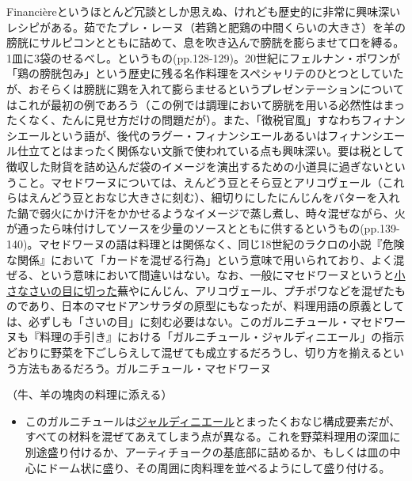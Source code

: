 \begin{recette}
{{{{{  Financière}というほとんど冗談としか思えぬ、けれども歴史的に非常に興味深いレシピがある。茹でたプレ・レーヌ（若鶏と肥鶏の中間くらいの大きさ）を羊の膀胱にサルピコンとともに詰めて、息を吹き込んで膀胱を膨らませて口を縛る。1皿に3袋のせるべし。というもの(pp.128-129)。20世紀にフェルナン・ポワンが「鶏の膀胱包み」という歴史に残る名作料理をスペシャリテのひとつとしていたが、おそらくは膀胱に鶏を入れて膨らませるというプレゼンテーションについてはこれが最初の例であろう（この例では調理において膀胱を用いる必然性はまったくなく、たんに見せ方だけの問題だが）。また、「徴税官風」すなわちフィナンシエールという語が、後代のラグー・フィナンシエールあるいはフィナンシエール仕立てとはまったく関係ない文脈で使われている点も興味深い。要は税として徴収した財貨を詰め込んだ袋のイメージを演出するための小道具に過ぎないということ。マセドワーヌについては、えんどう豆とそら豆とアリコヴェール（これらはえんどう豆とおなじ大きさに刻む）、細切りにしたにんじんをバターを入れた鍋で弱火にかけ汗をかかせるようなイメージで蒸し煮し、時々混ぜながら、火が通ったら味付けしてソースを少量のソースとともに供するというもの(pp.139-140)。マセドワーヌの語は料理とは関係なく、同じ18世紀のラクロの小説『危険な関係』において「カードを混ぜる行為」という意味で用いられており、よく混ぜる、という意味において間違いはない。なお、一般にマセドワーヌというと\ul{小さなさいの目に切った}蕪やにんじん、アリコヴェール、プチポワなどを混ぜたものであり、日本のマセドアンサラダの原型にもなったが、料理用語の原義としては、必ずしも「さいの目」に刻む必要はない。このガルニチュール・マセドワーヌも『料理の手引き』における「ガルニチュール・ジャルディニエール」の指示どおりに野菜を下ごしらえして混ぜても成立するだろうし、切り方を揃えるという方法もあるだろう。}}{ガルニチュール・マセドワーヌ}}\label{garniture-macedoine}}



（牛、羊の塊肉の料理に添える）

\begin{itemize}
\tightlist
\item
  このガルニチュールは\protect\hyperlink{garniture-jardiniere}{ジャルディニエール}とまったくおなじ構成要素だが、すべての材料を混ぜてあえてしまう点が異なる。これを野菜料理用の深皿に別途盛り付けるか、アーティチョークの基底部に詰めるか、もしくは皿の中心にドーム状に盛り、その周囲に肉料理を並べるようにして盛り付ける。
\end{itemize}


\end{recette}
